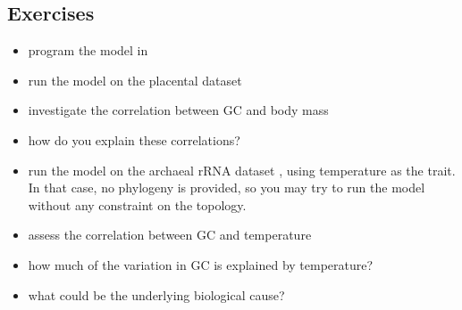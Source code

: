 \subsection*{Exercises}

\begin{itemize}
\item
program the model in \RevBayes
\item
run the model on the placental dataset
\item
investigate the correlation between GC and body mass
\item
how do you explain these correlations?
\item
run the model on the archaeal rRNA dataset , using temperature as the trait. In that case, no phylogeny is provided, so you may try to run the model without any constraint on the topology.
\item
assess the correlation between GC and temperature
\item
how much of the variation in GC is explained by temperature?
\item
what could be the underlying biological cause?
\end{itemize}


%
%
%
%



